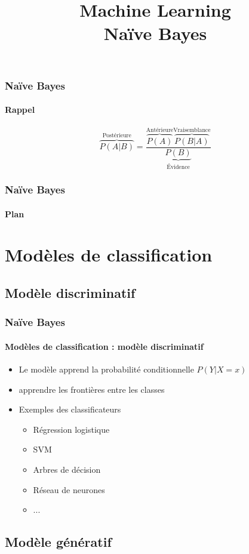 \documentclass[xcolor=table]{beamer}
\title[ML: Naïve Bayes] %
{Machine Learning \\Naïve Bayes}
\begin{document}
\begin{frame}
\frametitle{Naïve Bayes}
\framesubtitle{Rappel}
\huge
\[
\overbrace{P(A|B)}^\text{Postérieure} = \frac{\overbrace{P(A)}^\text{Antérieure} \overbrace{P(B|A)}^{\text{Vraisemblance}}}{\underbrace{P(B)}_\text{Évidence}}
\]
\end{frame}

\begin{frame}
\frametitle{Naïve Bayes}
\framesubtitle{Plan}

\begin{multicols}{2}
	\tableofcontents
\end{multicols}
\end{frame}

\section{Modèles de classification}

\subsection{Modèle discriminatif}

\begin{frame}
	\frametitle{Naïve Bayes}
	\framesubtitle{Modèles de classification : modèle discriminatif}
	
	\begin{itemize}
		\item Le modèle apprend la probabilité conditionnelle $P(Y|X=x)$
		\item apprendre les frontières entre les classes
		\item Exemples des classificateurs 
		\begin{itemize}
			\item Régression logistique
			\item SVM
			\item Arbres de décision 
			\item Réseau de neurones 
			\item ...
		\end{itemize}
	\end{itemize}
	
\end{frame}

\subsection{Modèle génératif}
\end{document}
